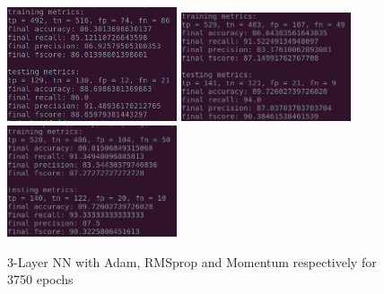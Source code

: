 \documentclass[a4paper,10pt,twocolumn]{article}
\begin{document}
\begin{figure}[h!]
\centering
\includegraphics[scale=1.0, width=5cm]{Fig41_Adam.png}
\includegraphics[scale=1.0, width=5cm]{Fig42_RMSprop.png}
\includegraphics[scale=1.0, width=5cm]{Fig43_SGD_momentum.png}
\caption*{3-Layer NN with Adam, RMSprop and Momentum respectively for 3750 epochs}
\end{figure}
\end{document}
